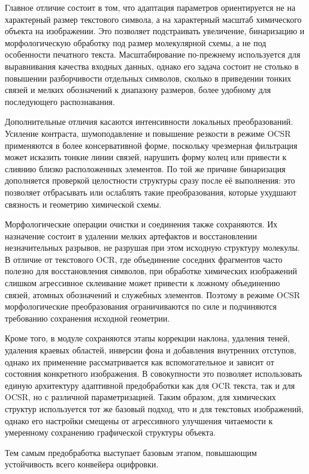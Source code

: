 Главное отличие состоит в том, что адаптация параметров ориентируется не на характерный размер текстового символа, а на характерный масштаб химического объекта на изображении. Это позволяет подстраивать увеличение, бинаризацию и морфологическую обработку под размер молекулярной схемы, а не под особенности печатного текста. Масштабирование по-прежнему используется для выравнивания качества входных данных, однако его задача состоит не столько в повышении разборчивости отдельных символов, сколько в приведении тонких связей и мелких обозначений к диапазону размеров, более удобному для последующего распознавания.

Дополнительные отличия касаются интенсивности локальных преобразований. Усиление контраста, шумоподавление и повышение резкости в режиме OCSR применяются в более консервативной форме, поскольку чрезмерная фильтрация может исказить тонкие линии связей, нарушить форму колец или привести к слиянию близко расположенных элементов. По той же причине бинаризация дополняется проверкой целостности структуры сразу после её выполнения: это позволяет отбрасывать или ослаблять такие преобразования, которые ухудшают связность и геометрию химической схемы.

Морфологические операции очистки и соединения также сохраняются. Их назначение состоит в удалении мелких артефактов и восстановлении незначительных разрывов, не разрушая при этом исходную структуру молекулы. В отличие от текстового OCR, где объединение соседних фрагментов часто полезно для восстановления символов, при обработке химических изображений слишком агрессивное склеивание может привести к ложному объединению связей, атомных обозначений и служебных элементов. Поэтому в режиме OCSR морфологические преобразования ограничиваются по силе и подчиняются требованию сохранения исходной геометрии.

Кроме того, в модуле сохраняются этапы коррекции наклона, удаления теней, удаления краевых областей, инверсии фона и добавления внутренних отступов, однако их применение рассматривается как вспомогательное и зависит от состояния конкретного изображения. В совокупности это позволяет использовать единую архитектуру адаптивной предобработки как для OCR текста, так и для OCSR, но с различной параметризацией. Таким образом, для химических структур используется тот же базовый подход, что и для текстовых изображений, однако его настройки смещены от агрессивного улучшения читаемости к умеренному сохранению графической структуры объекта.




Тем самым предобработка выступает базовым этапом, повышающим устойчивость всего конвейера оцифровки.